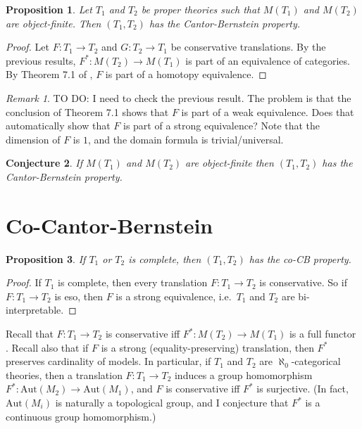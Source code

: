 \documentclass[12pt]{article}
\newtheorem{prop}{Proposition}
\newtheorem{conj}[prop]{Conjecture}
\theoremstyle{definition}
\theoremstyle{remark}
\newtheorem*{note}{Remark}
\newcommand{\3}{\mathcal}
\begin{document}
\begin{prop} Let $T_1$ and $T_2$ be proper theories such that $M(T_1)$
  and $M(T_2)$ are object-finite. Then $(T_1,T_2)$ has the
  Cantor-Bernstein property. \end{prop}

\begin{proof} Let $F:T_1\to T_2$ and $G:T_2\to T_1$ be conservative
  translations. By the previous results, $F^*:M(T_2)\to M(T_1)$ is
  part of an equivalence of categories. By Theorem 7.1 of
  \citep{summer2020}, $F$ is part of a homotopy
  equivalence.  \end{proof}

\begin{note} TO DO: I need to check the previous result. The problem
  is that the conclusion of Theorem 7.1 shows that $F$ is part of a
  weak equivalence. Does that automatically show that $F$ is part of a
  strong equivalence? Note that the dimension of $F$ is $1$, and the
  domain formula is trivial/universal. \end{note}

\begin{conj} If $M(T_1)$ and $M(T_2)$ are object-finite then
  $(T_1,T_2)$ has the Cantor-Bernstein property.  \end{conj}

\section{Co-Cantor-Bernstein}


\begin{prop} If $T_1$ or $T_2$ is complete, then $(T_1,T_2)$ has the
  co-CB property. \end{prop}

\begin{proof} If $T_1$ is complete, then every translation
  $F:T_1\to T_2$ is conservative. So if $F:T_1\to T_2$ is eso, then
  $F$ is a strong equivalence, i.e.\ $T_1$ and $T_2$ are
  bi-interpretable. \end{proof}

Recall that $F:T_1\to T_2$ is conservative iff $F^*:M(T_2)\to M(T_1)$
is a full functor \citep{barrett2020}. Recall also that if $F$ is a
strong (equality-preserving) translation, then $F^*$ preserves
cardinality of models. In particular, if $T_1$ and $T_2$ are
$\aleph _0$-categorical theories, then a translation $F:T_1\to T_2$
induces a group homomorphism
$F^*:\mathrm{Aut}(M_2)\to \mathrm{Aut}(M_1)$, and $F$ is conservative
iff $F^*$ is surjective. (In fact, $\mathrm{Aut}(M_i)$ is naturally a
topological group, and I conjecture that $F^*$ is a continuous group
homomorphism.)
\end{document}
